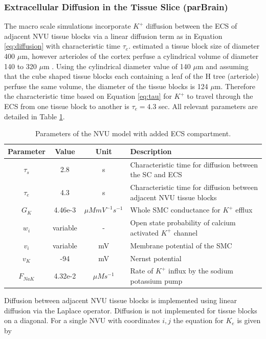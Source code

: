 	\subsubsection{Extracellular Diffusion in the Tissue Slice (parBrain)}
		The macro scale simulations incorporate $K^+$ diffusion between the ECS of adjacent NVU tissue blocks via a linear diffusion term as in Equation \eqref{eq:diffusion} with characteristic time $\tau_e$. \cite{Dormanns2015b} estimated a tissue block size of diameter 400 $\mu$m, however arterioles of the cortex perfuse a cylindrical volume of diameter 140 to 320 $\mu$m \citep{boas}. Using the cylindrical diameter value of 140 $\mu$m and assuming that the cube shaped tissue blocks each containing a leaf of the H tree (arteriole) perfuse the same volume, the diameter of the tissue blocks is 124 $\mu$m. Therefore the characteristic time based on Equation \ref{eq:tau} for $K^+$ to travel through the ECS from one tissue block to another is $\tau_e = 4.3$ sec.  All relevant parameters are detailed in Table \ref{tab:csdpaper}.
		
				\begin{table}[h!]
					\small
					\centering
						\begin{tabular}{c c c l}
						\hline
						Parameter & Value & Unit & Description \\
						\hline
						$\tau_s$ & 2.8 & s & Characteristic time for diffusion between the SC and ECS \\
						$\tau_e$ & 4.3 & s & Characteristic time for diffusion between adjacent NVU tissue blocks \\
						$G_K$ & 4.46e-3 & $\mu M m V^{-1} s^{-1}$ & Whole SMC conductance for $K^+$ efflux \\
						$w_i$ & variable & - & Open state probability of calcium activated $K^+$ channel \\				
						$v_i$ & variable & mV & Membrane potential of the SMC \\
						$v_K$ & -94 & mV & Nernst potential \\		
						$F_{NaK}$ & 4.32e-2 & $\mu M s^{-1}$ & Rate of $K^+$ influx by the sodium potassium pump \\			
						\hline
						\end{tabular}
						\caption{Parameters of the NVU model with added ECS compartment.}
						\label{tab:csdpaper}
				\end{table}
		
		Diffusion between adjacent NVU tissue blocks is implemented using linear diffusion via the Laplace operator. Diffusion is not implemented for tissue blocks on a diagonal. For a single NVU with coordinates $i,j$ the equation for $K_e$ is given by
		
